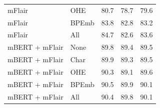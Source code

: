 \documentclass[12pt,a4paper,]{book}
\begin{document}
\begin{longtable}[t]{llrrr}
\hspace{1em}mFlair & OHE & 80.7 & 78.7 & 79.6\\
\hspace{1em}mFlair & BPEmb & 83.8 & 82.8 & 83.2\\
\hspace{1em}mFlair & All & 84.7 & 82.6 & 83.6\\
\hspace{1em}mBERT + mFlair & None & 89.8 & 89.4 & 89.5\\
\hspace{1em}mBERT + mFlair & Char & 89.9 & 89.3 & 89.5\\
\hspace{1em}mBERT + mFlair & OHE & 90.3 & 89.1 & 89.6\\
\hspace{1em}mBERT + mFlair & BPEmb & 90.5 & 89.9 & 90.1\\
\hspace{1em}mBERT + mFlair & All & 90.4 & 89.8 & 90.1\\*
\end{longtable}
\endgroup{}

\newpage

\begingroup\fontsize{10}{12}\selectfont
\end{document}
